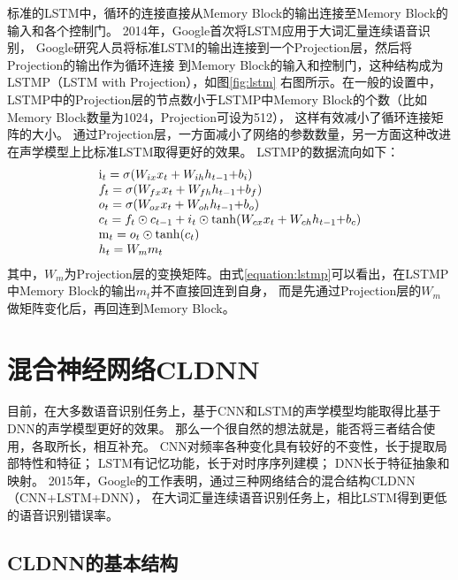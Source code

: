 标准的LSTM中，循环的连接直接从Memory Block的输出连接至Memory Block的输入和各个控制门。
2014年，Google首次将LSTM应用于大词汇量连续语音识别，
Google研究人员将标准LSTM的输出连接到一个Projection层，然后将Projection的输出作为循环连接
到Memory Block的输入和控制门，这种结构成为LSTMP（LSTM with Projection），如图\ref{fig:lstm}
右图所示。在一般的设置中，LSTMP中的Projection层的节点数小于LSTMP中Memory Block的个数（比如Memory Block数量为1024，Projection可设为512），
这样有效减小了循环连接矩阵的大小。
通过Projection层，一方面减小了网络的参数数量，另一方面这种改进在声学模型上比标准LSTM取得更好的效果。
LSTMP的数据流向如下：
\begin{equation}
\label{equation:lstmp}
\begin{array}{l}
{{\rm{i}}_t} = \sigma ({W_{ix}}{x_t} + {W_{ih}}{h_{t - 1}}{\rm{ + }}{b_i})\\
{f_t} = \sigma ({W_{fx}}{x_t} + {W_{fh}}{h_{t - 1}}{\rm{ + }}{b_f})\\
{o_t} = \sigma ({W_{ox}}{x_t} + {W_{oh}}{h_{t - 1}}{\rm{ + }}{b_o})\\
{c_t} = {f_t} \odot {c_{t - 1}} + {i_t} \odot \tanh ({W_{cx}}{x_t} + {W_{ch}}{h_{t - 1}}{\rm{ + }}{b_c})\\
{{\rm{m}}_t} = {o_t} \odot \tanh ({c_t})\\
{h_t} = {W_m}{m_t}
\end{array}
\end{equation}
其中，$W_m$为Projection层的变换矩阵。由式\ref{equation:lstmp}可以看出，在LSTMP中Memory Block的输出$m_t$并不直接回连到自身，
而是先通过Projection层的$W_m$做矩阵变化后，再回连到Memory Block。

\section{混合神经网络CLDNN}

目前，在大多数语音识别任务上，基于CNN和LSTM的声学模型均能取得比基于DNN的声学模型更好的效果。
那么一个很自然的想法就是，能否将三者结合使用，各取所长，相互补充。
CNN对频率各种变化具有较好的不变性，长于提取局部特性和特征；
LSTM有记忆功能，长于对时序序列建模；
DNN长于特征抽象和映射。
2015年，Google的工作表明，通过三种网络结合的混合结构CLDNN（CNN+LSTM+DNN），
在大词汇量连续语音识别任务上，相比LSTM得到更低的语音识别错误率。

\subsection{CLDNN的基本结构}

